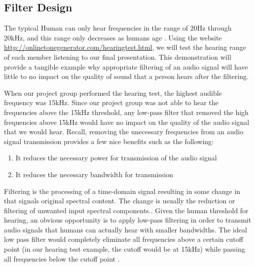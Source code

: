 \subsection{Filter Design}

The typical Human can only hear frequencies in the range of 20Hz through 20kHz, and this range only decreases as humans age  \cite{human:rg}.  Using the website \url{http://onlinetonegenerator.com/hearingtest.html}, we will test the hearing range of each member listening to our final presentation.  This demonstration will provide a tangible example why appropriate filtering of an audio signal will have little to no impact on the quality of sound that a person hears after the filtering.  

When our project group performed the hearing test, the highest audible frequency was 15kHz.  Since our project group was not able to hear the frequencies above the 15kHz threshold, any low-pass filter that removed the high frequencies above 15kHz would have no impact on the quality of the audio signal that  we would hear.  Recall, removing the unecessary frequencies from an audio signal transmission provides a few nice benefits such as the following: 

\begin{enumerate}
\item It reduces the necessary power for transmission of the audio signal
\item It reduces the necessary bandwidth for transmission
\end{enumerate}

Filtering is the processing of a time-domain signal resulting in some change in that signals original spectral content.  The change is usually the reduction or filtering of unwanted input spectral components.\cite{lyons:intro}.  Given the human threshold for hearing, an obvious opportunity is to apply low-pass filtering in order to transmit audio signals that humans can actually hear with smaller bandwidths.  The ideal low pass filter would completely eliminate all frequencies above a certain cutoff point (in our hearing test example, the cutoff would be at 15kHz) while passing all frequencies below the cutoff point \cite{lowpass:wiki}.       

